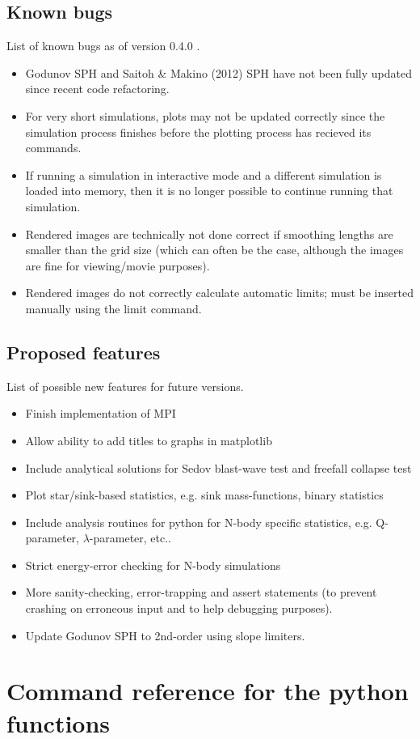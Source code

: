 \documentclass[a4paper]{article}
\newcommand{\VERNO}{0.4.0 }
\begin{document}
\subsection{Known bugs}
List of known bugs as of version \VERNO.

\begin{itemize}
\item Godunov SPH and Saitoh \& Makino (2012) SPH have not been fully updated since recent code refactoring.
\item For very short simulations, plots may not be updated correctly since the simulation process finishes before the plotting process has recieved its commands.
\item If running a simulation in interactive mode and a different simulation is loaded into memory, then it is no longer possible to continue running that simulation.
\item Rendered images are technically not done correct if smoothing lengths are smaller than the grid size (which can often be the case, although the images are fine for viewing/movie purposes).
\item Rendered images do not correctly calculate automatic limits; must be inserted manually using the limit command.
\end{itemize}


\subsection{Proposed features}
List of possible new features for future versions.

\begin{itemize}
\item Finish implementation of MPI
\item Allow ability to add titles to graphs in matplotlib
\item Include analytical solutions for Sedov blast-wave test and freefall collapse test
\item Plot star/sink-based statistics, e.g. sink mass-functions, binary statistics
\item Include analysis routines for python for N-body specific statistics, e.g. Q-parameter, $\lambda$-parameter, etc..
\item Strict energy-error checking for N-body simulations
\item More sanity-checking, error-trapping and assert statements (to prevent crashing on erroneous input and to help debugging purposes).
\item Update Godunov SPH to 2nd-order using slope limiters.
\end{itemize}

\newpage

\appendix

\def\tableofcontents{}
\section{Command reference for the python functions}
\label{reference_facade}

\end{document}
